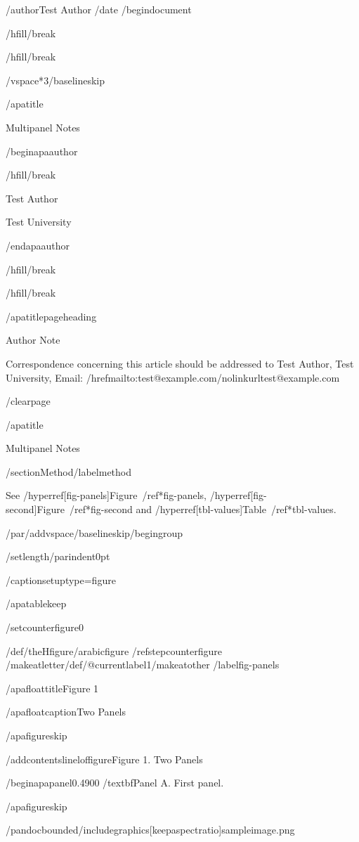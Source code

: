 /author{Test Author}
/date{}
/begin{document}


/hfill/break

/hfill/break

/vspace*{3/baselineskip}

/apatitle{

Multipanel Notes

}

/begin{apaauthor}

/hfill/break

Test Author

Test University

/end{apaauthor}

/hfill/break

/hfill/break

/apatitlepageheading{

Author Note

}

Correspondence concerning this article should be addressed to Test
Author, Test University, Email:
/href{mailto:test@example.com}{/nolinkurl{test@example.com}}

/clearpage

/apatitle{

Multipanel Notes

}

/section{Method}/label{method}

See /hyperref[fig-panels]{Figure~/ref*{fig-panels}},
/hyperref[fig-second]{Figure~/ref*{fig-second}} and
/hyperref[tbl-values]{Table~/ref*{tbl-values}}.

/par/addvspace{/baselineskip}/begingroup

/setlength{/parindent}{0pt}

/captionsetup{type=figure}

/apatablekeep

/setcounter{figure}{0}

/def/theHfigure{/arabic{figure}}%
/refstepcounter{figure}%
/makeatletter/def/@currentlabel{1}/makeatother%
/label{fig-panels}

/apafloattitle{Figure 1}

/apafloatcaption{Two Panels}

/apafigureskip

/addcontentsline{lof}{figure}{Figure 1. Two Panels}

/begin{apapanel}{0.4900}%
/textbf{Panel A}. First panel.

/apafigureskip

/pandocbounded{/includegraphics[keepaspectratio]{sampleimage.png}}

